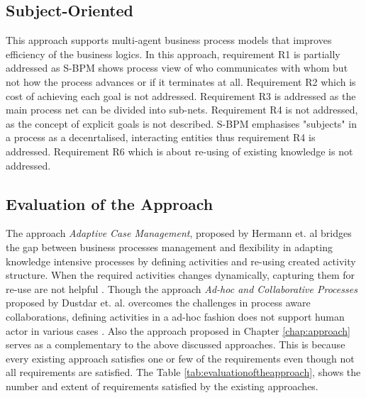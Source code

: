 \subsection{Subject-Oriented} 
This approach \cite{Fleischmann2013} supports multi-agent business process models that improves efficiency of the business logics. In this approach, requirement R1 is partially addressed  as S-BPM shows process view of who communicates with whom
but not how the process advances or if it terminates at all. Requirement R2 which is cost of achieving each goal is not addressed. Requirement R3 is addressed as the main process net can be divided into sub-nets. Requirement R4 is not addressed, as  the concept of explicit goals is not described. S-BPM emphasises "subjects" in a process as a decenrtalised, interacting entities thus requirement R4 is addressed. Requirement R6 which is about re-using of existing knowledge is not addressed. 

\subsection {Evaluation of the Approach}
The approach \textit{Adaptive Case Management}, proposed by Hermann et. al \cite{Herrmann2011} bridges the gap between business processes management and flexibility in adapting knowledge intensive processes by defining activities and re-using created activity structure. When the required activities changes dynamically, capturing them for re-use are not helpful \cite{Sungur2015}. Though the approach \textit{Ad-hoc and Collaborative Processes} proposed by Dustdar et. al. overcomes the challenges in process aware collaborations, defining activities in a ad-hoc fashion does not support human actor in various cases \cite{Sungur2015}. Also the approach proposed in Chapter \ref{chap:approach} serves as a complementary to the above discussed  approaches.  This is because every existing approach satisfies one or few of the requirements even though not all requirements are satisfied. The Table \ref{tab:evaluationoftheapproach}, shows the number and extent of requirements satisfied by the existing approaches. 

